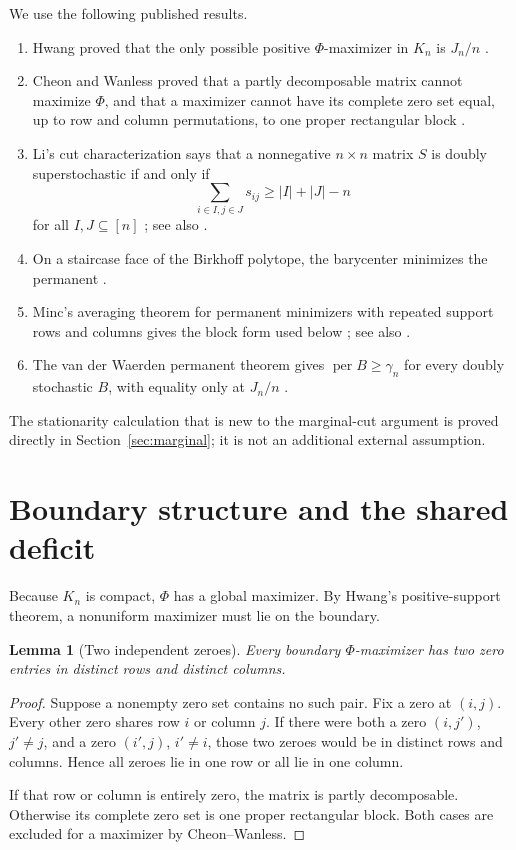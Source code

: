 \documentclass[11pt]{article}
\newtheorem{lemma}[theorem]{Lemma}
\theoremstyle{remark}
\newcommand{\per}{\operatorname{per}}
\begin{document}
We use the following published results.
\begin{enumerate}
\item Hwang proved that the only possible positive $\Phi$-maximizer in $K_n$
is $J_n/n$ \cite{Hwang1986}.
\item Cheon and Wanless proved that a partly decomposable matrix cannot
maximize $\Phi$, and that a maximizer cannot have its complete zero set equal,
up to row and column permutations, to one proper rectangular block
\cite[Theorems 3.2 and 3.7]{CheonWanless2012}.
\item Li's cut characterization says that a nonnegative $n\times n$ matrix
$S$ is doubly superstochastic if and only if
\[
 \sum_{i\in I,j\in J}s_{ij}\ge |I|+|J|-n
\]
for all $I,J\subseteq[n]$ \cite{Li1990}; see also
\cite[Lemma 2.2]{CheonWanless2012}.
\item On a staircase face of the Birkhoff polytope, the barycenter minimizes
the permanent \cite{Hwang1985}.
\item Minc's averaging theorem for permanent minimizers with repeated support
rows and columns gives the block form used below \cite[Theorem 1]{Minc1984};
see also \cite[Section 2]{PulaSongWanless2011}.
\item The van der Waerden permanent theorem gives $\per B\ge\gamma_n$ for
every doubly stochastic $B$, with equality only at $J_n/n$
\cite{Egorychev1981,Falikman1981}.
\end{enumerate}
The stationarity calculation that is new to the marginal-cut argument is
proved directly in Section~\ref{sec:marginal}; it is not an additional
external assumption.

\section{Boundary structure and the shared deficit}

Because $K_n$ is compact, $\Phi$ has a global maximizer.  By Hwang's
positive-support theorem, a nonuniform maximizer must lie on the boundary.

\begin{lemma}[Two independent zeroes]\label{lem:independent-zeros}
Every boundary $\Phi$-maximizer has two zero entries in distinct rows and
distinct columns.
\end{lemma}
\begin{proof}
Suppose a nonempty zero set contains no such pair.  Fix a zero at $(i,j)$.
Every other zero shares row $i$ or column $j$.  If there were both a zero
$(i,j')$, $j'\ne j$, and a zero $(i',j)$, $i'\ne i$, those two zeroes would be
in distinct rows and columns.  Hence all zeroes lie in one row or all lie in
one column.

If that row or column is entirely zero, the matrix is partly decomposable.
Otherwise its complete zero set is one proper rectangular block.  Both cases
are excluded for a maximizer by Cheon--Wanless.
\end{proof}
\end{document}
